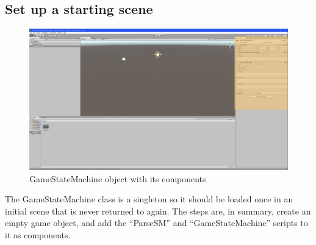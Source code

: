 \documentclass[letter,12pt]{article}
\begin{document}
\subsection{Set up a starting scene}

\begin{figure}
 \includegraphics[width=6in]{inspector.png}
 \caption{GameStateMachine object with its components}
 \label{fig:inspector}
\end{figure}

The GameStateMachine class is a singleton so it should be loaded once in an initial scene that is never returned to again.  The steps are, in summary, create an empty game object, and add the “ParseSM” and “GameStateMachine” scripts to it as components.
\end{document}
